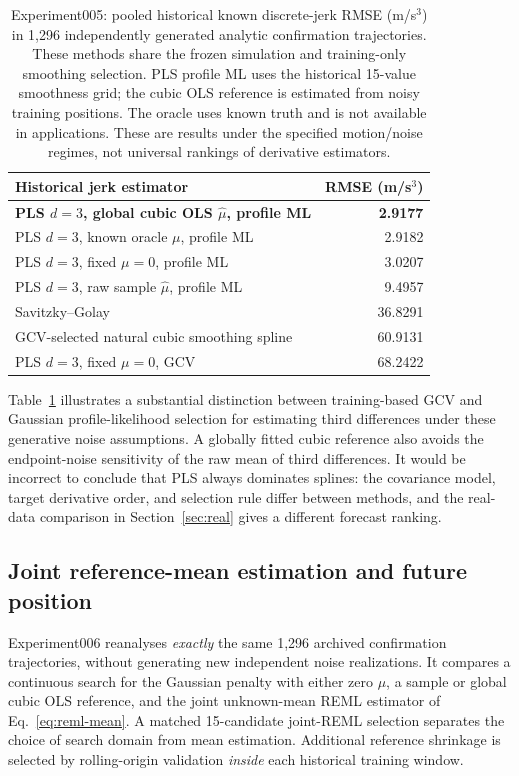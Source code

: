 \begin{table}[t]
\centering
\caption{Experiment005: pooled historical known
discrete-jerk RMSE (m/s$^3$) in
1,296 independently generated analytic
confirmation trajectories. These methods
share the frozen simulation and
training-only smoothing selection.
PLS profile ML uses the historical
15-value smoothness grid;
the cubic OLS reference is estimated
from noisy training positions.
The oracle uses known truth and is
not available in applications.
These are results under the specified
motion/noise regimes, not universal
rankings of derivative estimators.}
\label{tab:sim-jerk-classical}
\begin{tabular}{lr}
\toprule
Historical jerk estimator & RMSE (m/s$^3$)\\
\midrule
\textbf{PLS $d=3$, global cubic OLS $\widehat\mu$, profile ML}
 & \textbf{2.9177}\\
PLS $d=3$, known oracle $\mu$, profile ML
 & 2.9182\\
PLS $d=3$, fixed $\mu=0$, profile ML
 & 3.0207\\
PLS $d=3$, raw sample $\widehat\mu$, profile ML
 & 9.4957\\
Savitzky--Golay
 & 36.8291\\
GCV-selected natural cubic smoothing spline
 & 60.9131\\
PLS $d=3$, fixed $\mu=0$, GCV
 & 68.2422\\
\bottomrule
\end{tabular}
\end{table}

Table~\ref{tab:sim-jerk-classical}
illustrates a substantial distinction
between training-based GCV and
Gaussian profile-likelihood selection
for estimating third differences
under these generative noise assumptions.
A globally fitted cubic reference
also avoids the endpoint-noise
sensitivity of the raw mean of
third differences.
It would be incorrect to conclude
that PLS always dominates splines:
the covariance model, target
derivative order, and selection
rule differ between methods,
and the real-data comparison
in Section~\ref{sec:real}
gives a different forecast ranking.

\subsection{Joint reference-mean estimation and future position}
Experiment006 reanalyses \emph{exactly}
the same 1,296 archived confirmation
trajectories, without generating new
independent noise realizations.
It compares a continuous search
for the Gaussian penalty with either
zero $\mu$, a sample or global cubic
OLS reference, and the joint
unknown-mean REML estimator of
Eq.~\eqref{eq:reml-mean}.
A matched 15-candidate joint-REML
selection separates the choice of
search domain from mean estimation.
Additional reference shrinkage is
selected by rolling-origin validation
\emph{inside} each historical training
window.

